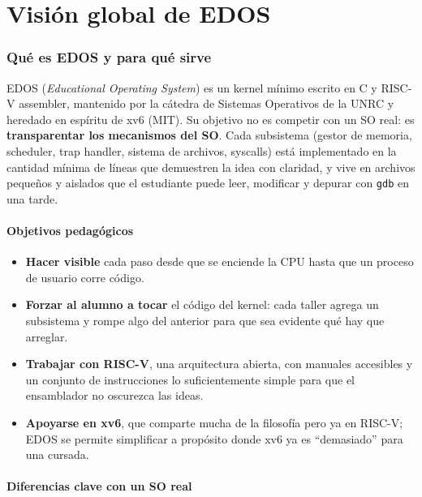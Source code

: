 \documentclass[11pt,a4paper]{article}
\begin{document}
\tableofcontents
\newpage

\part{Visión global de EDOS}

\section{Qué es EDOS y para qué sirve}

EDOS (\emph{Educational Operating System}) es un kernel mínimo
escrito en C y RISC-V assembler, mantenido por la cátedra de
Sistemas Operativos de la UNRC y heredado en espíritu de xv6 (MIT).
Su objetivo no es competir con un SO real: es \textbf{transparentar
los mecanismos del SO}. Cada subsistema (gestor de memoria,
scheduler, trap handler, sistema de archivos, syscalls) está
implementado en la cantidad mínima de líneas que demuestren la idea
con claridad, y vive en archivos pequeños y aislados que el
estudiante puede leer, modificar y depurar con \texttt{gdb} en una
tarde.

\subsection*{Objetivos pedagógicos}

\begin{itemize}[leftmargin=*]
    \item \textbf{Hacer visible} cada paso desde que se enciende la
        CPU hasta que un proceso de usuario corre código.
    \item \textbf{Forzar al alumno a tocar} el código del kernel:
        cada taller agrega un subsistema y rompe algo del anterior
        para que sea evidente qué hay que arreglar.
    \item \textbf{Trabajar con RISC-V}, una arquitectura abierta,
        con manuales accesibles y un conjunto de instrucciones lo
        suficientemente simple para que el ensamblador no oscurezca
        las ideas.
    \item \textbf{Apoyarse en xv6}, que comparte mucha de la filosofía
        pero ya en RISC-V; EDOS se permite simplificar a propósito
        donde xv6 ya es ``demasiado'' para una cursada.
\end{itemize}

\subsection*{Diferencias clave con un SO real}
\end{document}
